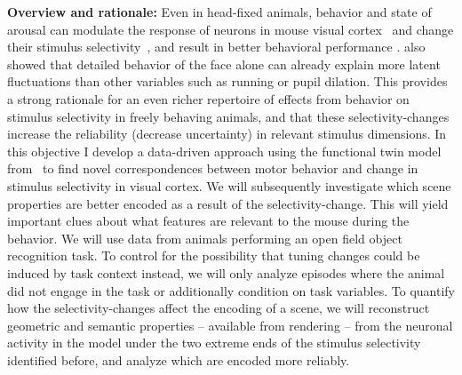 \documentclass[B2,COG]{ercgrant}
\begin{document}
\textbf{Overview and rationale:} 
Even in head-fixed animals, behavior and state of arousal can modulate the response of neurons in mouse visual cortex~\parencite{Niell2010-bs, Stringer2019-lt, Musall2019-kd} and change their stimulus selectivity~\parencite{Franke2022-do,Chiappe2010-bm, Bezdudnaya2006-ge,Treue1996-lp, Andermann2011-vw}, and result in better behavioral performance \parencite{Spitzer1988-kq, Bennett2013-rk, Dadarlat2017-jw, De_Gee2022-ir}.
\textcite{Stringer2019-lt} also showed that detailed behavior of the face alone can already explain more latent fluctuations than other variables such as running or pupil dilation.
This provides a strong rationale for an even richer repertoire of effects from behavior on stimulus selectivity in freely behaving animals, and that these selectivity-changes increase the reliability (decrease uncertainty) in relevant stimulus dimensions. 
In this objective I develop a data-driven approach using the functional twin model from~ to find novel correspondences between motor behavior and change in stimulus selectivity in visual cortex. 
We will subsequently investigate which scene properties are better encoded as a result of the selectivity-change.
This will yield important clues about what features are relevant to the mouse during the behavior. 
We will use data from animals performing an open field object recognition task. 
To control for the possibility that tuning changes could be induced by task context instead, we will only analyze episodes where the animal did not engage in the task or additionally condition on task variables. 
To quantify how the selectivity-changes affect the encoding of a scene, we will reconstruct geometric and semantic properties -- available from rendering -- from the neuronal activity in the model under the two extreme ends of the stimulus selectivity identified before, and analyze which are encoded more reliably. 
\end{document}
